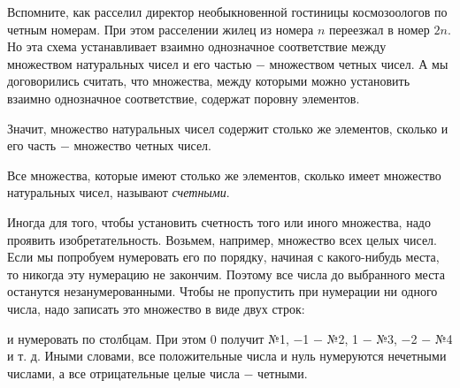 \documentclass{article}
\begin{document}
Вспомните, как расселил директор необыкновенной гостиницы космозоологов по четным номерам. При этом расселении жилец из номера \(n\) переезжал в номер \(2n\). Но эта схема устанавливает взаимно однозначное соответствие между множеством натуральных чисел и его частью \(-\) множеством четных чисел. А мы договорились считать, что множества, между которыми можно установить взаимно однозначное соответствие, содержат поровну элементов.

Значит, множество натуральных чисел содержит столько же элементов, сколько и его часть \(-\) множество четных чисел. \newline

Все множества, которые имеют столько же элементов, сколько имеет множество натуральных чисел, называют \textit{счетными}. \newline

Иногда для того, чтобы установить счетность того или иного множества, надо проявить изобретательность. Возьмем, например, множество всех целых чисел. Если мы попробуем нумеровать его по порядку, начиная с какого-нибудь места, то никогда эту нумерацию не закончим. Поэтому все числа до выбранного места останутся незанумерованными. Чтобы не пропустить при нумерации ни одного числа, надо записать это множество в виде двух строк:

\begin{center}
\end{center}
и нумеровать по столбцам. При этом 0 получит №1, \(-\)1 \(-\) №2, 1 \(-\) №3, \(-\)2 \(-\) №4 и т. д. Иными словами, все положительные числа и нуль нумеруются нечетными числами, а все отрицательные целые числа \(-\) четными. \newline
\end{document}
